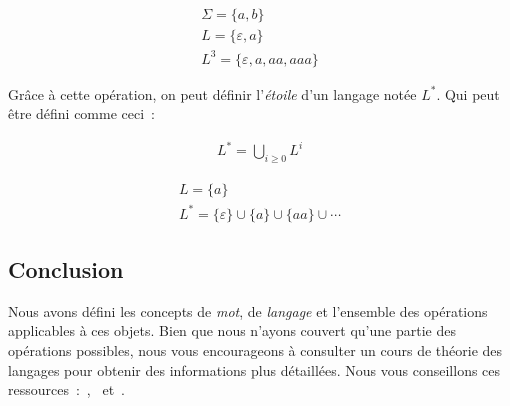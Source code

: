 \begin{example}
    \begin{gather*}
        \Sigma = \{a, b\} \\
        L = \{\varepsilon, a\} \\
        L^3 = \{\varepsilon, a, aa, aaa\}
    \end{gather*}
\end{example}

\begin{definition}
    Grâce à cette opération, on peut définir l'\textit{étoile} d'un langage notée
    \(L^*\). Qui peut être défini comme ceci~:

    \begin{gather*}
        L^* = \bigcup_{i \geq 0} L^i
    \end{gather*}
\end{definition}

\begin{example}
    \begin{gather*}
        L = \{a\} \\
        L^* = \{\varepsilon\} \cup \{a\} \cup \{aa\} \cup \cdots
    \end{gather*}
\end{example}

\subsection{Conclusion}

Nous avons défini les concepts de \textit{mot}, de \textit{langage} et
l'ensemble des opérations applicables à ces objets. Bien que nous n'ayons
couvert qu'une partie des opérations possibles, nous vous encourageons à
consulter un cours de théorie des langages pour obtenir des informations plus
détaillées. Nous vous conseillons ces
ressources~:~\cite{Harrison1978},~\cite{Autebert1994} et~\cite{Hopcroft2007}.